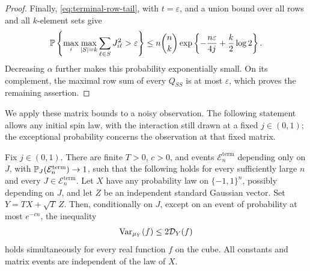\begin{proof}
Finally, \eqref{eq:terminal-row-tail}, with $t=\varepsilon$, and a union
bound over all rows and all $k$-element sets give
\[
 \mathbb P\left\{\max_i\max_{|S|=k}\sum_{\ell\in S}J_{i\ell}^2
                                     >\varepsilon\right\}
 \le n\binom nk
       \exp\left\{-\frac{n\varepsilon}{4j}+\frac{k}{2}\log2\right\}.
\]
Decreasing $\alpha$ further makes this probability exponentially small.
On its complement, the maximal row sum of every $Q_{SS}$ is at most
$\varepsilon$, which proves the remaining assertion.
\end{proof}

We apply these matrix bounds to a noisy observation. The following statement
allows any initial spin law, with the interaction still drawn at a fixed
$j\in(0,1)$; the exceptional probability concerns the observation at
that fixed matrix.

\begin{proposition}
\label{prop:terminal-gap}
Fix $j\in(0,1)$.  There are finite $T>0$, $c>0$, and events
$\mathcal E_n^{\mathrm{term}}$ depending only on $J$, with
$\mathbb P_J(\mathcal E_n^{\mathrm{term}})\to1$, such that the following holds
for every sufficiently large $n$ and every $J\in\mathcal E_n^{\mathrm{term}}$.
Let $X$ have any probability law on $\{-1,1\}^n$, possibly depending on
$J$, and let $Z$ be an independent standard Gaussian vector.  Set
$Y=TX+\sqrt T\,Z$.  Then, conditionally on $J$, except on an event of
probability at most $e^{-cn}$, the inequality
\begin{equation}
 \operatorname{Var}_{\mu_Y}(f)\le 2\mathcal D_Y(f)
 \label{eq:terminal-poincare}
\end{equation}
holds simultaneously for every real function $f$ on the cube.
All constants and matrix events are independent of the law of $X$.
\end{proposition}

